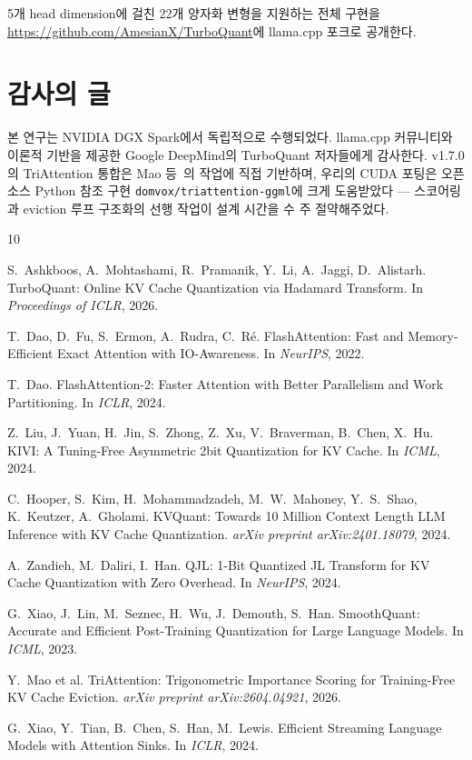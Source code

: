 \documentclass[10pt,twocolumn]{article}
\begin{document}
5개 head dimension에 걸친 22개 양자화 변형을 지원하는 전체 구현을 \url{https://github.com/AmesianX/TurboQuant}에 llama.cpp 포크로 공개한다.

\section*{감사의 글}

본 연구는 NVIDIA DGX Spark에서 독립적으로 수행되었다. llama.cpp 커뮤니티와 이론적 기반을 제공한 Google DeepMind의 TurboQuant 저자들에게 감사한다. v1.7.0의 TriAttention 통합은 Mao 등~\cite{triattention2026}의 작업에 직접 기반하며, 우리의 CUDA 포팅은 오픈소스 Python 참조 구현 \texttt{domvox/triattention-ggml}에 크게 도움받았다 --- 스코어링과 eviction 루프 구조화의 선행 작업이 설계 시간을 수 주 절약해주었다.


\begin{thebibliography}{10}

S.~Ashkboos, A.~Mohtashami, R.~Pramanik, Y.~Li, A.~Jaggi, D.~Alistarh.
\newblock TurboQuant: Online KV Cache Quantization via Hadamard Transform.
\newblock In \emph{Proceedings of ICLR}, 2026.

T.~Dao, D.~Fu, S.~Ermon, A.~Rudra, C.~R\'{e}.
\newblock FlashAttention: Fast and Memory-Efficient Exact Attention with IO-Awareness.
\newblock In \emph{NeurIPS}, 2022.

T.~Dao.
\newblock FlashAttention-2: Faster Attention with Better Parallelism and Work Partitioning.
\newblock In \emph{ICLR}, 2024.

Z.~Liu, J.~Yuan, H.~Jin, S.~Zhong, Z.~Xu, V.~Braverman, B.~Chen, X.~Hu.
\newblock KIVI: A Tuning-Free Asymmetric 2bit Quantization for KV Cache.
\newblock In \emph{ICML}, 2024.

C.~Hooper, S.~Kim, H.~Mohammadzadeh, M.~W.~Mahoney, Y.~S.~Shao, K.~Keutzer, A.~Gholami.
\newblock KVQuant: Towards 10 Million Context Length LLM Inference with KV Cache Quantization.
\newblock \emph{arXiv preprint arXiv:2401.18079}, 2024.

A.~Zandieh, M.~Daliri, I.~Han.
\newblock QJL: 1-Bit Quantized JL Transform for KV Cache Quantization with Zero Overhead.
\newblock In \emph{NeurIPS}, 2024.

G.~Xiao, J.~Lin, M.~Seznec, H.~Wu, J.~Demouth, S.~Han.
\newblock SmoothQuant: Accurate and Efficient Post-Training Quantization for Large Language Models.
\newblock In \emph{ICML}, 2023.

Y.~Mao et al.
\newblock TriAttention: Trigonometric Importance Scoring for Training-Free KV Cache Eviction.
\newblock \emph{arXiv preprint arXiv:2604.04921}, 2026.

G.~Xiao, Y.~Tian, B.~Chen, S.~Han, M.~Lewis.
\newblock Efficient Streaming Language Models with Attention Sinks.
\newblock In \emph{ICLR}, 2024.

\end{thebibliography}
\end{document}
